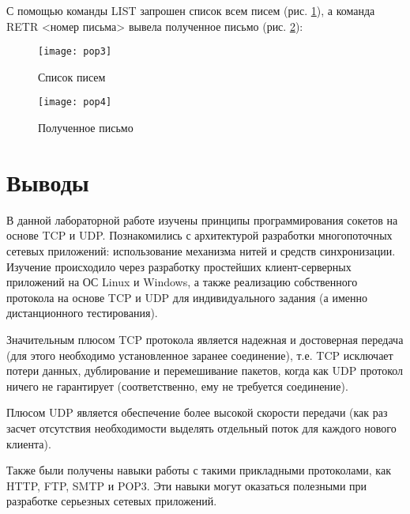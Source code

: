 С помощью команды LIST запрошен список всем писем  (рис. \ref{pic:pop3}), а команда RETR <номер письма> вывела полученное письмо (рис. \ref{pic:pop4}):

\begin{figure}[H]
	\begin{center}
		\texttt{[image: pop3]}
		\caption{Список писем} 
		\label{pic:pop3} %
	\end{center}
\end{figure}

\begin{figure}[H]
	\begin{center}
		\texttt{[image: pop4]}
		\caption{Полученное письмо} 
		\label{pic:pop4} %
	\end{center}
\end{figure}


\section{Выводы}
В данной лабораторной работе изучены принципы программирования сокетов на основе TCP и UDP. Познакомились с архитектурой разработки многопоточных сетевых приложений: использование механизма нитей и средств синхронизации. Изучение происходило через разработку простейших клиент-серверных приложений на ОС Linux и Windows, а также реализацию собственного протокола на основе TCP и UDP для индивидуального задания (а именно дистанционного тестирования). 

Значительным плюсом TCP протокола является надежная и достоверная передача (для этого необходимо установленное заранее соединение), т.е. TCP исключает потери данных, дублирование и перемешивание пакетов, когда как UDP протокол ничего не гарантирует (соответственно, ему не требуется соединение).  

Плюсом UDP является обеспечение более высокой скорости передачи (как раз засчет отсутствия необходимости выделять отдельный поток для каждого нового клиента). 

Также были получены навыки работы с такими прикладными протоколами, как HTTP, FTP, SMTP и POP3. Эти навыки могут оказаться полезными при разработке серьезных сетевых приложений. 


